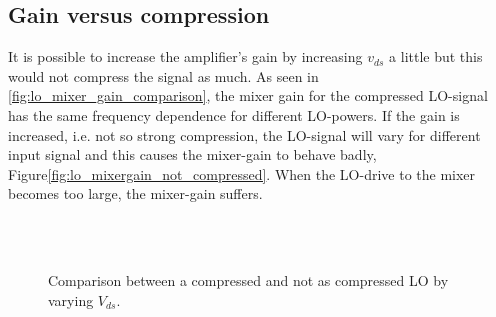 
	\subsection{Gain versus compression}
		It is possible to increase the amplifier's gain by increasing $v_{ds}$ a little but this would not compress the signal as much. As seen in \autoref{fig:lo_mixer_gain_comparison}, the mixer gain for the compressed LO-signal has the same frequency dependence for different LO-powers. If the gain is increased, i.e. not so strong compression, the LO-signal will vary for different input signal and this causes the mixer-gain to behave badly, Figure\autoref{fig:lo_mixergain_not_compressed}. When the LO-drive to the mixer becomes too large, the mixer-gain suffers.


				\begin{figure}[hpt!]
					\centering
					 \\
					 \\
					\caption{Comparison between a compressed and not as compressed LO by varying $V_{ds}$.}\label{fig:lo_mixer_gain_comparison}
				\end{figure}




